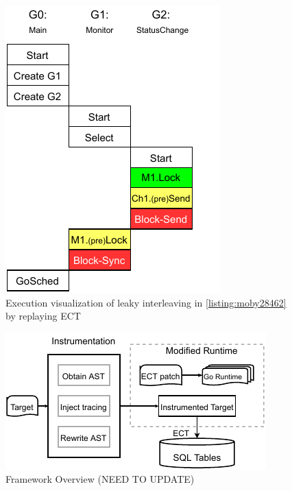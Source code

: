 \begin{figure}[]
\centering

\includegraphics[width=0.6\linewidth]{figs/execVis.pdf}
\caption{Execution visualization of leaky interleaving in \ref{listing:moby28462} by replaying ECT}
\label{fig:execVis}
\end{figure}

\begin{figure}
\centering
  \includegraphics[width=.95\linewidth]{figs/overview.pdf}
  \caption{Framework Overview (NEED TO UPDATE)}
  \label{fig:overview}
\end{figure}

